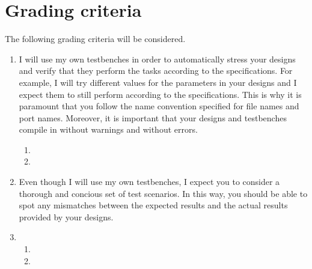 \documentclass[number=03]{assignment}
\begin{document}
\section{Grading criteria}\label{sec:Grading}
The following grading criteria will be considered.

\begin{enumerate}
\item {}
I will use my own testbenches in order to automatically stress your designs and verify that they perform the tasks according to the specifications. 
For example, I will try different values for the parameters in your designs and I expect them to still perform according to the specifications.
This is why it is paramount that you follow the name convention specified for file names and port names.
Moreover, it is important that your designs and testbenches compile in \ModelSim without warnings and without errors.
\begin{enumerate}
\item {}
\item {}
\end{enumerate}

\item {}
Even though I will use my own testbenches, I expect you to consider a thorough and concious set of test scenarios.
In this way, you should be able to spot any mismatches between the expected results and the actual results provided by your designs.
\item {}
\begin{enumerate}
\item {}
\item {}
\end{enumerate}


\end{enumerate}
\end{document}
